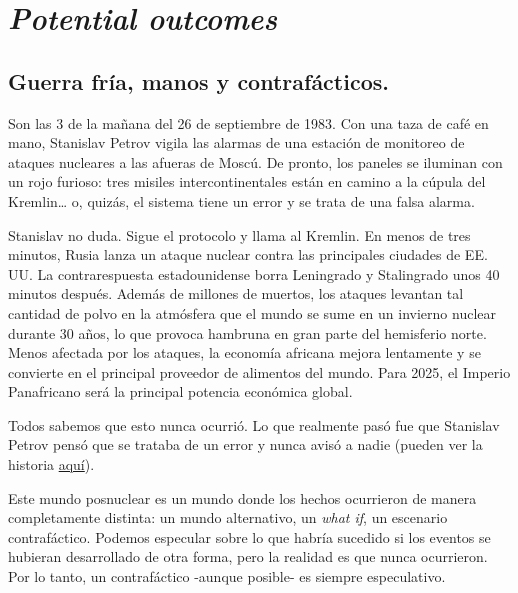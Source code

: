 \documentclass[
  letterpaper,
  DIV=11,
  numbers=noendperiod,
  oneside]{scrreprt}
\begin{document}

\hypertarget{sec-pot-outcomes}{%
\chapter{\texorpdfstring{\emph{Potential
outcomes}}{Potential outcomes}}\label{sec-pot-outcomes}}

\hypertarget{guerra-fruxeda-manos-y-contrafuxe1cticos.}{%
\section{Guerra fría, manos y
contrafácticos.}\label{guerra-fruxeda-manos-y-contrafuxe1cticos.}}

Son las 3 de la mañana del 26 de septiembre de 1983. Con una taza de
café en mano, Stanislav Petrov vigila las alarmas de una estación de
monitoreo de ataques nucleares a las afueras de Moscú. De pronto, los
paneles se iluminan con un rojo furioso: tres misiles intercontinentales
están en camino a la cúpula del Kremlin\ldots{} o, quizás, el sistema
tiene un error y se trata de una falsa alarma.

Stanislav no duda. Sigue el protocolo y llama al Kremlin. En menos de
tres minutos, Rusia lanza un ataque nuclear contra las principales
ciudades de EE. UU. La contrarespuesta estadounidense borra Leningrado y
Stalingrado unos 40 minutos después. Además de millones de muertos, los
ataques levantan tal cantidad de polvo en la atmósfera que el mundo se
sume en un invierno nuclear durante 30 años, lo que provoca hambruna en
gran parte del hemisferio norte. Menos afectada por los ataques, la
economía africana mejora lentamente y se convierte en el principal
proveedor de alimentos del mundo. Para 2025, el Imperio Panafricano será
la principal potencia económica global.

Todos sabemos que esto nunca ocurrió. Lo que realmente pasó fue que
Stanislav Petrov pensó que se trataba de un error y nunca avisó a nadie
(pueden ver la historia
\href{https://www.bbc.com/mundo/noticias/2013/09/130926_internacional_ruso_detuvo_ataque_nuclear_jrg}{aquí}).

Este mundo posnuclear es un mundo donde los hechos ocurrieron de manera
completamente distinta: un mundo alternativo, un \emph{what if}, un
escenario contrafáctico. Podemos especular sobre lo que habría sucedido
si los eventos se hubieran desarrollado de otra forma, pero la realidad
es que nunca ocurrieron. Por lo tanto, un contrafáctico -aunque posible-
es siempre especulativo.
\end{document}
